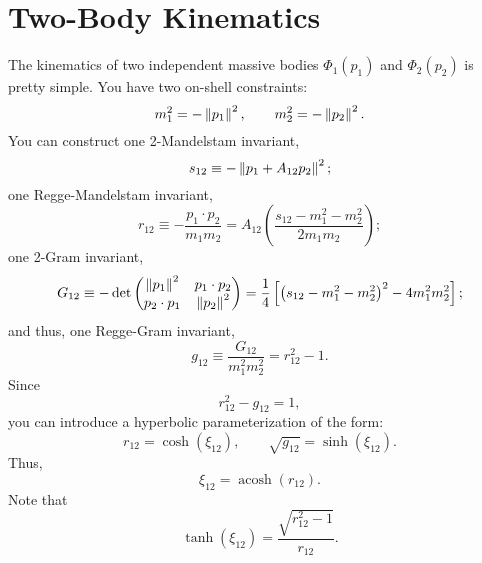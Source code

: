 \chapter{Two-Body Kinematics}
The kinematics of two independent massive bodies $\Phi_{1}(p_{1})$ and $\Phi_{2}(p_{2})$ is pretty simple. You have two on-shell constraints:
\begin{equation}
	m_{1}^{2} = - \left\Vert p_{1} \right\Vert^{2}, \qquad m_{2}^{2} = - \left\Vert p_{2} \right\Vert^{2}.
\end{equation}
You can construct one 2-Mandelstam invariant,
\begin{equation}
	s_{12} \equiv - \left\Vert p_{1} + A_{12} p_{2} \right\Vert^{2};
\end{equation}
one Regge-Mandelstam invariant,
\begin{equation}
	r_{12} \equiv - \frac{p_{1} \cdot p_{2}}{m_{1} m_{2}} = A_{12} \left( \frac{s_{12} - m_{1}^{2} - m_{2}^{2}}{2 m_{1} m_{2}} \right);
\end{equation}
one 2-Gram invariant,
\begin{equation}
	G_{12} \equiv - \det{ \begin{pmatrix} \left\Vert p_{1} \right\Vert^{2} & p_{1} \cdot p_{2} \\ p_{2} \cdot p_{1} & \left\Vert p_{2} \right\Vert^{2} \end{pmatrix} } = \frac{1}{4} \left[ \left( s_{12} - m_{1}^{2} - m_{2}^{2} \right)^{2} - 4 m_{1}^{2} m_{2}^{2} \right];
\end{equation}
and thus, one Regge-Gram invariant,
\begin{equation}
	g_{12} \equiv \frac{G_{12}}{m_{1}^{2} m_{2}^{2}} = r_{12}^{2} - 1.
\end{equation}
Since
\begin{equation}
	r_{12}^{2} - g_{12} = 1,
\end{equation}
you can introduce a hyperbolic parameterization of the form:
\begin{equation}
	r_{12} = \operatorname{cosh}{\left( \xi_{12} \right)}, \qquad \sqrt{g_{12}} = \operatorname{sinh}{\left( \xi_{12} \right)}.
\end{equation}
Thus,
\begin{equation}
	\xi_{12} = \operatorname{acosh}{\left( r_{12} \right)}.
\end{equation}
Note that
\begin{equation}
	\operatorname{tanh}{\left( \xi_{12} \right)} = \frac{\sqrt{r_{12}^{2} - 1}}{r_{12}}.
\end{equation}
